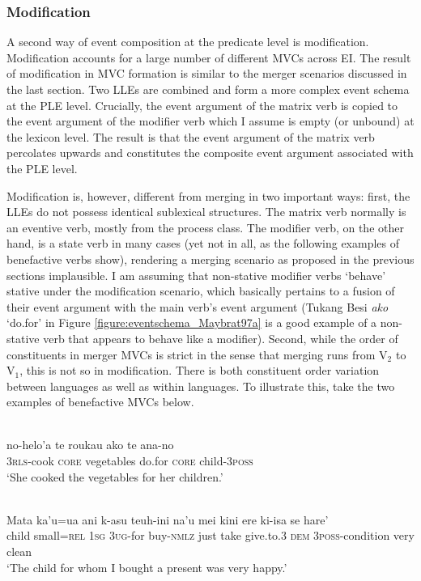 \subsubsection{Modification}
\label{sec:modification}

A second way of event composition at the predicate level is modification. Modification accounts for a large number of different MVCs across EI. The result of modification in MVC formation is similar to the merger scenarios discussed in the last section. Two LLEs are combined and form a more complex event schema at the PLE level. Crucially, the event argument of the matrix verb is copied to the event argument of the modifier verb which I assume is empty (or unbound) at the lexicon level. The result is that the event argument of the matrix verb percolates upwards and constitutes the composite event argument associated with the PLE level.

Modification is, however, different from merging in two important ways: first, the LLEs do not possess identical sublexical structures. The matrix verb normally is an eventive verb, mostly from the process class. The modifier verb, on the other hand, is a state verb in many cases (yet not in all, as the following examples of benefactive verbs show), rendering a merging scenario as proposed in the previous sections implausible. I am assuming that non-stative modifier verbs `behave' stative under the modification scenario, which basically pertains to a fusion of their event argument with the main verb's event argument (Tukang Besi \textit{ako} `do.for' in Figure \ref{figure:eventschema_Maybrat97a} is a good example of a non-stative verb that appears to behave like a modifier). Second, while the order of constituents in merger MVCs is strict in the sense that merging runs from V$_2$ to V$_1$, this is not so in modification. There is both constituent order variation between languages as well as within languages. To illustrate this, take the two examples of benefactive MVCs below.

\ea \label{Tukang_3}
\\
\gll no-helo'a te roukau ako te ana-no \\
3\textsc{rls}-cook \textsc{core} vegetables do.for \textsc{core} child-3\textsc{poss} \\
\glft `She cooked the vegetables for her children.' \\ 
\z

\ea \label{Makalero_2}
\\
\gll Mata ka’u=ua ani k-asu teuh-ini na’u mei kini ere ki-isa se hare’ \\
child small=\textsc{rel} 1\textsc{sg} 3\textsc{ug}-for buy-\textsc{nmlz} just take give.to.3 \textsc{dem} 3\textsc{poss}-condition very clean \\
\glft `The child for whom I bought a present was very happy.' \\ 
\z

